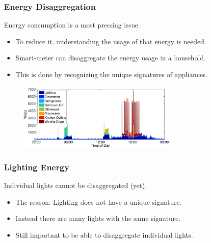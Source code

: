 \documentclass{beamer}
\begin{document}
	\begin{frame}\frametitle{Energy Disaggregation}

		Energy consumption is a most pressing issue.

		\begin{itemize}

			\item To reduce it, understanding the usage of that energy is needed.

			\item Smart-meter can disaggregate the energy usage in a household.

			\item This is done by recognizing the unique signatures of appliances.

		\end{itemize}

		\begin{figure}[t]
			\centering
			\includegraphics[width=0.7\textwidth]{../chapters/introduction-chapters/energy-consumption-house.png}
		\end{figure}


	\end{frame}






	\begin{frame}\frametitle{Lighting Energy}

		Individual lights cannot be disaggregated (yet).

		\begin{itemize}

			\item The reason: Lighting does not have a unique signature. %

			\item Instead there are many lights with the same signature.

			\item Still important to be able to disaggregate individual lights. %

		\end{itemize}


	\end{frame}
\end{document}
